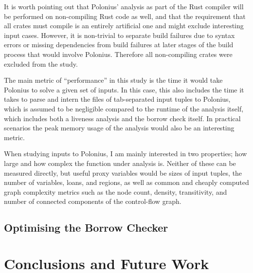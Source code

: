 \documentclass[11pt,a4paper,twoside,openany]{report}
\newcommand{\fixme}[1] {{\color{red}#1}}
\begin{document}
It is worth pointing out that Polonius' analysis as part of the Rust compiler
will be performed on non-compiling Rust code as well, and that the requirement
that all crates must compile is an entirely artificial one and might exclude
interesting input cases. However, it is non-trivial to separate build failures
due to syntax errors or missing dependencies from build failures at later stages
of the build process that would involve Polonius. Therefore all non-compiling
crates were excluded from the study.

The main metric of ``performance'' in this study is the time it would take
Polonius to solve a given set of inputs. In this case, this also includes the
time it takes to parse and intern the files of tab-separated input tuples to
Polonius, which is assumed to be negligible compared to the runtime of the
analysis itself, which includes both a liveness analysis and the borrow check
itself. In practical scenarios the peak memory usage of the analysis would also
be an interesting metric.

When studying inputs to Polonius, I am mainly interested in two properties; how
large and how complex the function under analysis is. Neither of these can be
measured directly, but useful proxy variables would be sizes of input tuples,
the number of variables, loans, and regions, as well as common and cheaply
computed graph complexity metrics such as the node count, density, transitivity,
and number of connected components of the control-flow graph.






\section{Optimising the Borrow Checker}\label{sec:optim-borr-check}



\chapter{Conclusions and Future Work}\label{cha:conclusions}


\printbibliography[heading=bibintoc]
\end{document}
